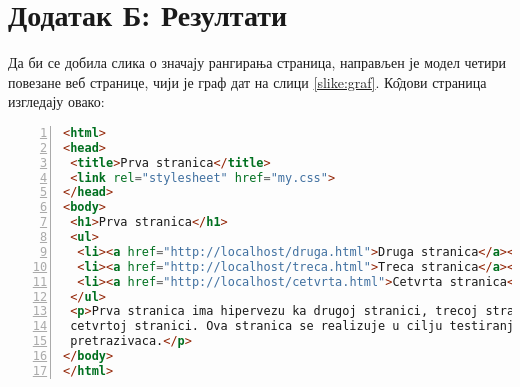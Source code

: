 \section{Додатак Б: Резултати}\label{sec:dodatakb}
		Да би се добила слика о значају рангирања страница, направљен је модел четири повезане веб странице, чији је граф дат на слици \ref{slike:graf}. К\^{о}дови страница изгледају овако:\\
		
\begin{lstlisting}[language=HTML, caption=K\^{о}д прве странице, label={lst:prva}, numbers=left]
<html>
<head>
 <title>Prva stranica</title>
 <link rel="stylesheet" href="my.css">
</head>
<body>
 <h1>Prva stranica</h1>
 <ul>
  <li><a href="http://localhost/druga.html">Druga stranica</a></li>
  <li><a href="http://localhost/treca.html">Treca stranica</a></li>
  <li><a href="http://localhost/cetvrta.html">Cetvrta stranica</a></li>
 </ul>
 <p>Prva stranica ima hipervezu ka drugoj stranici, trecoj stranici,
 cetvrtoj stranici. Ova stranica se realizuje u cilju testiranja veb
 pretrazivaca.</p>
</body>
</html>
\end{lstlisting}%
\medskip

